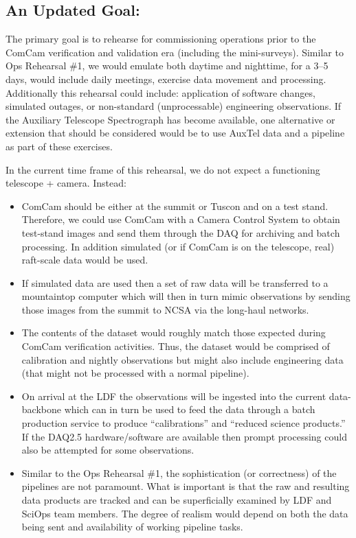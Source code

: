 \subsection{An Updated Goal:}

The primary goal is to rehearse for commissioning operations prior to the ComCam 
verification and validation era (including the mini-surveys).  
Similar to Ops Rehearsal \#1, we would emulate both daytime and nighttime, 
for a 3--5 days, would include daily meetings, exercise data movement and
processing.  Additionally this rehearsal could include: application of software 
changes, simulated outages, or non-standard (unprocessable) engineering 
observations.  If the Auxiliary Telescope Spectrograph has become available,
one alternative or extension that should be considered would be to use AuxTel 
data and a pipeline as part of these exercises.

In the current time frame of this rehearsal, we do not expect a functioning 
telescope + camera.  Instead:

\begin{itemize}[topsep=-8pt]
\item ComCam should be either at the summit or Tuscon and on a test stand.
Therefore, we could use ComCam with a Camera Control System to obtain test-stand
images and send them through the DAQ for archiving and batch processing.  In 
addition simulated (or if ComCam is on the telescope, real) raft-scale data
would be used.

\item If simulated data are used then a set of raw data will be transferred to 
a mountaintop computer which will then in turn mimic observations by sending 
those images from the summit to NCSA via the long-haul networks.

\item The contents of the dataset would roughly match those expected during 
ComCam verification activities.  Thus, the dataset would be comprised of
calibration and nightly observations but might also include engineering data
(that might not be processed with a normal pipeline).

\item On arrival at the LDF the observations will be ingested into the current
data-backbone which can in turn be used to feed the data through a batch
production service to produce ``calibrations'' and ``reduced science products.''
If the DAQ2.5 hardware/software are available then prompt processing could 
also be attempted for some observations.

\item Similar to the Ops Rehearsal \#1, the sophistication (or correctness)
of the pipelines are not paramount.  What is important is that the raw and
resulting data products are tracked and can be superficially examined by LDF and
SciOps team members.  The degree of realism would depend on both the data
being sent and availability of working pipeline tasks.
\end{itemize}


